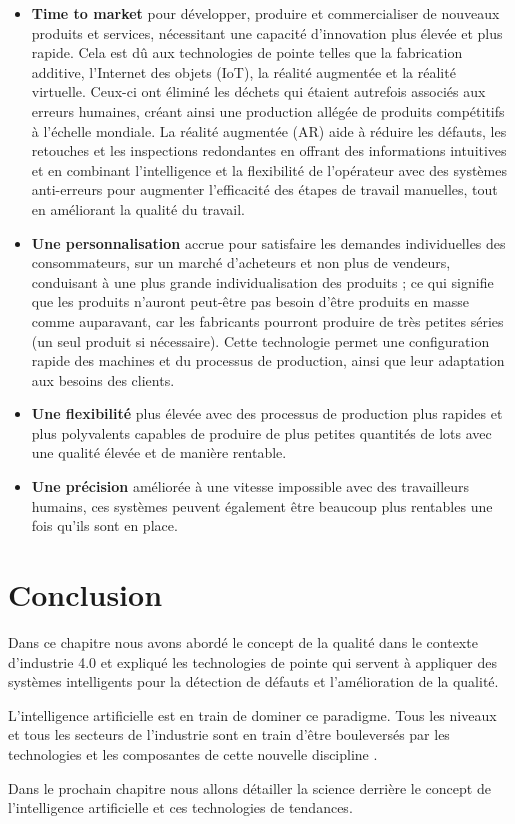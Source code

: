\begin{itemize}
    \item \textbf{Time to market} pour développer, produire et commercialiser de nouveaux produits et services, nécessitant une capacité d'innovation plus élevée et plus rapide. Cela est dû aux technologies de pointe telles que la fabrication additive, l'Internet des objets (IoT), la réalité augmentée et la réalité virtuelle. Ceux-ci ont éliminé les déchets qui étaient autrefois associés aux erreurs humaines, créant ainsi une production allégée de produits compétitifs à l'échelle mondiale. La réalité augmentée (AR) aide à réduire les défauts, les retouches et les inspections redondantes en offrant des informations intuitives et en combinant l'intelligence et la flexibilité de l'opérateur avec des systèmes anti-erreurs pour augmenter l'efficacité des étapes de travail manuelles, tout en améliorant la qualité du travail.
    \item \textbf{Une personnalisation} accrue pour satisfaire les demandes individuelles des consommateurs, sur un marché d'acheteurs et non plus de vendeurs, conduisant à une plus grande individualisation des produits ; ce qui signifie que les produits n'auront peut-être pas besoin d'être produits en masse comme auparavant, car les fabricants pourront produire de très petites séries (un seul produit si nécessaire). Cette technologie permet une configuration rapide des machines et du processus de production, ainsi que leur adaptation aux besoins des clients.
    \item \textbf{Une flexibilité} plus élevée avec des processus de production plus rapides et plus polyvalents capables de produire de plus petites quantités de lots avec une qualité élevée et de manière rentable.
    \item \textbf{Une précision} améliorée à une vitesse impossible avec des travailleurs humains, ces systèmes peuvent également être beaucoup plus rentables une fois qu'ils sont en place.
\end{itemize}
\newpage
\section{Conclusion}
Dans ce chapitre nous avons abordé le concept de la qualité dans le contexte d’industrie 4.0 et expliqué les technologies de pointe qui servent à appliquer des systèmes intelligents pour la détection de défauts et l'amélioration de la qualité.

L’intelligence artificielle est en train de dominer ce paradigme. Tous les niveaux et tous les secteurs de l’industrie sont en train d’être bouleversés par les technologies et les composantes de cette nouvelle discipline .

Dans le prochain chapitre nous allons détailler la science derrière le concept de l’intelligence artificielle et ces technologies de tendances.






